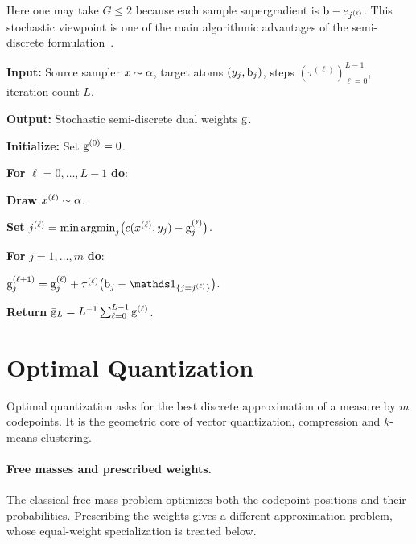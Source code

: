 Here one may take $G\leq2$ because each sample supergradient is $\mathrm{b}-e_{j^{(\ell)}}$. This stochastic viewpoint is one of the main algorithmic advantages of the semi-discrete formulation~\cite{Merigot11,genevay2016stochastic}.

\begin{alg}\label{alg:semidiscrete-stochastic-ascent}
\textbf{Input:} Source sampler $x\sim\alpha$, target atoms $(y_j,\mathrm{b}_j)$, steps $(\tau^{(\ell)})_{\ell=0}^{L-1}$, iteration count $L$.

\textbf{Output:} Stochastic semi-discrete dual weights $\mathrm{g}$.

\textbf{Initialize:} Set $\mathrm{g}^{(0)}=0$.

\textbf{For} $\ell=0,\ldots,L-1$ \textbf{do}:
\begin{algblock}

\textbf{Draw} $x^{(\ell)}\sim\alpha$.

\textbf{Set} \(j^{(\ell)}=\min\operatorname{argmin}_j\bigl(c(x^{(\ell)},y_j)-\mathrm{g}_j^{(\ell)}\bigr)\).

\textbf{For} $j=1,\ldots,m$ \textbf{do}:
\begin{algblock}
\(\gD_j^{(\ell+1)} = \gD_j^{(\ell)} + \tau^{(\ell)}\bigl(\b_j-\ones_{\{j=j^{(\ell)}\}}\bigr)\).
\end{algblock}
\end{algblock}
\algreturnskip
\textbf{Return} $\bar{\mathrm{g}}_L=L^{-1}\sum_{\ell=0}^{L-1}\mathrm{g}^{(\ell)}$.
\end{alg}


\section{Optimal Quantization}
\label{sec-optimal-quantization}

Optimal quantization asks for the best discrete approximation of a measure by $m$ codepoints. It is the geometric core of vector quantization, compression and $k$-means clustering.

\paragraph{Free masses and prescribed weights.}
The classical free-mass problem optimizes both the codepoint positions and their probabilities. Prescribing the weights gives a different approximation problem, whose equal-weight specialization is treated below.

